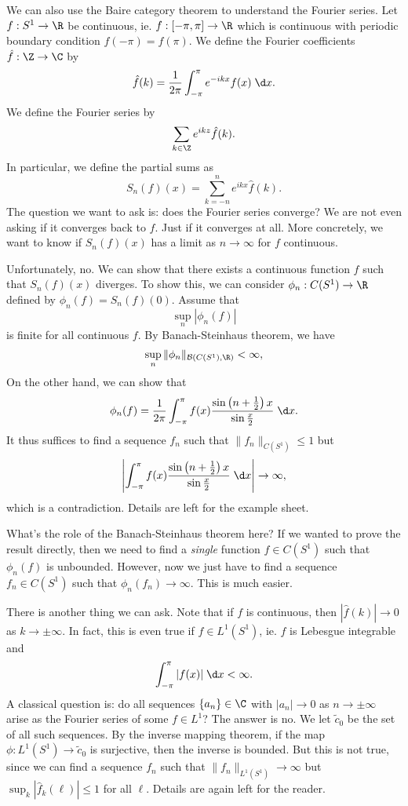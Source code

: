 \documentclass[a4paper]{article}
\begin{document}
\begin{eg}
  We can also use the Baire category theorem to understand the Fourier series. Let $f: S^1 \to \R$ be continuous, ie. $f: [-\pi, \pi] \to \R$ which is continuous with periodic boundary condition $f(-\pi) = f(\pi)$. We define the Fourier coefficients $\hat{f}: \Z \to \C$ by
  \[
    \hat{f}(k) = \frac{1}{2\pi} \int_{-\pi}^\pi e^{-ikx}f(x)\;\d x.
  \]
  We define the Fourier series by
  \[
    \sum_{k \in \Z} e^{ikz}\hat{f}(k).
  \]
  In particular, we define the partial sums as
  \[
    S_n(f)(x) = \sum_{k = -n}^n e^{ikx}\hat{f}(k).
  \]
  The question we want to ask is: does the Fourier series converge? We are not even asking if it converges back to $f$. Just if it converges at all. More concretely, we want to know if $S_n(f)(x)$ has a limit as $n \to \infty$ for $f$ continuous.

  Unfortunately, no. We can show that there exists a continuous function $f$ such that $S_n(f)(x)$ diverges. To show this, we can consider $\phi_n: C(S^1) \to \R$ defined by $\phi_n (f) = S_n(f)(0)$. Assume that
  \[
    \sup_n |\phi_n (f)|
  \]
  is finite for all continuous $f$. By Banach-Steinhaus theorem, we have
  \[
    \sup_n \|\phi_n\|_{\mathcal{B}(C(S^1), \R)} < \infty,
  \]
  On the other hand, we can show that
  \[
    \phi_n(f) = \frac{1}{2\pi}\int_{-\pi}^\pi f(x)\frac{\sin\left(n + \frac{1}{2}\right)x}{\sin \frac{x}{2}} \;\d x.
  \]
  It thus suffices to find a sequence $f_n$ such that $\|f_n\|_{C(S^1)} \leq 1$ but
  \[
    \left|\int_{-\pi}^\pi f(x)\frac{\sin\left(n + \frac{1}{2}\right)x}{\sin \frac{x}{2}}\;\d x\right|\to \infty,
  \]
  which is a contradiction. Details are left for the example sheet.

  What's the role of the Banach-Steinhaus theorem here? If we wanted to prove the result directly, then we need to find a \emph{single} function $f\in C(S^1)$ such that $\phi_n(f)$ is unbounded. However, now we just have to find a sequence $f_n \in C(S^1)$ such that $\phi_n(f_n) \to \infty$. This is much easier.

  There is another thing we can ask. Note that if $f$ is continuous, then $|\hat{f}(k)| \to 0$ as $k \to \pm\infty$. In fact, this is even true if $f \in L^1(S^1)$, ie. $f$ is Lebesgue integrable and
  \[
    \int_{-\pi}^\pi |f(x)| \;\d x < \infty.
  \]
  A classical question is: do all sequences $\{a_n\}\in \C$ with $|a_n| \to 0$ as $n \to \pm \infty$ arise as the Fourier series of some $f\in L^1$? The answer is no. We let $\tilde{c}_0$ be the set of all such sequences. By the inverse mapping theorem, if the map $\phi: L^1(S^1) \to \tilde{c}_0$ is surjective, then the inverse is bounded. But this is not true, since we can find a sequence $f_n$ such that $\|f_n\|_{L^1(S^1)} \to \infty$ but $\sup_k |\hat{f}_k(\ell)| \leq 1$ for all $\ell$. Details are again left for the reader.
\end{eg}
\end{document}
